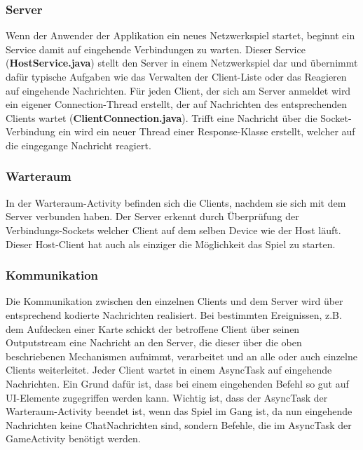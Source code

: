 \documentclass[11pt,a4paper]{article}
\begin{document}
\subsubsection{Server}
Wenn der Anwender der Applikation ein neues Netzwerkspiel startet, beginnt ein Service damit auf eingehende Verbindungen zu warten. Dieser Service (\textbf{HostService.java}) stellt den Server in einem Netzwerkspiel dar und übernimmt dafür typische Aufgaben wie das Verwalten der Client-Liste oder das Reagieren auf eingehende Nachrichten. Für jeden Client, der sich am Server anmeldet wird ein eigener Connection-Thread erstellt, der auf Nachrichten des entsprechenden Clients wartet (\textbf{ClientConnection.java}). Trifft eine Nachricht über die Socket-Verbindung ein wird ein neuer Thread einer Response-Klasse erstellt, welcher auf die eingegange Nachricht reagiert.
\subsubsection{Warteraum}
In der Warteraum-Activity befinden sich die Clients, nachdem sie sich mit dem Server verbunden haben. Der Server erkennt durch Überprüfung der Verbindungs-Sockets welcher Client auf dem selben Device wie der Host läuft. Dieser Host-Client hat auch als einziger die Möglichkeit das Spiel zu starten.
\subsubsection{Kommunikation}
Die Kommunikation zwischen den einzelnen Clients und dem Server wird über entsprechend kodierte Nachrichten realisiert. Bei bestimmten Ereignissen, z.B. dem Aufdecken einer Karte schickt der betroffene Client über seinen Outputstream eine Nachricht an den Server, die dieser über die oben beschriebenen Mechanismen aufnimmt, verarbeitet und an alle oder auch einzelne Clients weiterleitet.
Jeder Client wartet in einem AsyncTask auf eingehende Nachrichten. Ein Grund dafür ist, dass bei einem eingehenden Befehl so gut auf UI-Elemente zugegriffen werden kann. Wichtig ist, dass der AsyncTask der Warteraum-Activity beendet ist, wenn das Spiel im Gang ist, da nun eingehende Nachrichten keine ChatNachrichten sind, sondern Befehle, die im AsyncTask der GameActivity benötigt werden.
\end{document}
